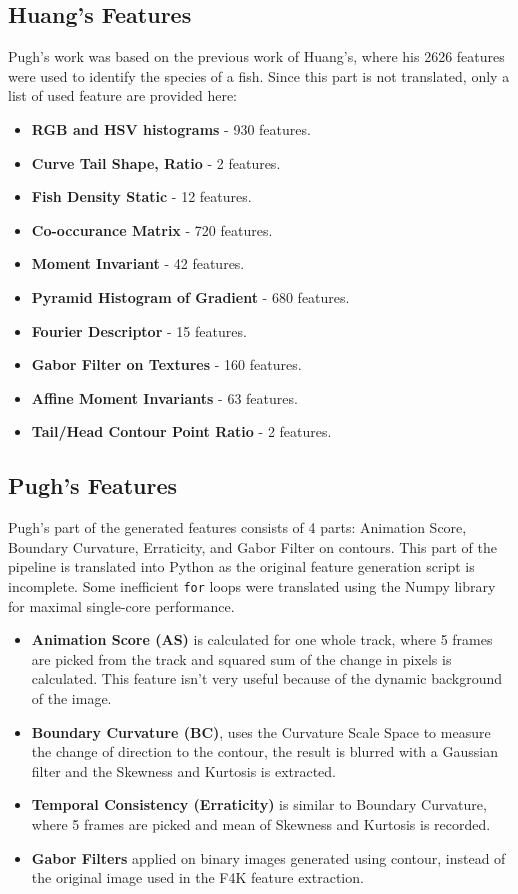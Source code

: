 \documentclass[bsc,logo,twoside,fullspacing,parskip]{infthesis}
\begin{document}
\subsection{Huang's Features}

Pugh's work was based on the previous work of Huang's\cite{Huang}, where his 2626 features were used to identify the species of a fish.
Since this part is not translated, only a list of used feature are provided here:
\begin{itemize}
\setlength{\parskip}{1pt}
\item \textbf{RGB and HSV histograms} - 930 features.
\item \textbf{Curve Tail Shape, Ratio} - 2 features.
\item \textbf{Fish Density Static} - 12 features.
\item \textbf{Co-occurance Matrix} - 720 features.
\item \textbf{Moment Invariant} - 42 features.
\item \textbf{Pyramid Histogram of Gradient} - 680 features.
\item \textbf{Fourier Descriptor} - 15 features.
\item \textbf{Gabor Filter on Textures} - 160 features.
\item \textbf{Affine Moment Invariants} - 63 features.
\item \textbf{Tail/Head Contour Point Ratio} - 2 features.
\end{itemize}

\subsection{Pugh's Features}

Pugh's part of the generated features consists of 4 parts: Animation Score, Boundary Curvature, Erraticity, and Gabor Filter on contours. 
This part of the pipeline is translated into Python as the original feature generation script is incomplete. Some inefficient {\tt for} loops were translated using the Numpy library for maximal single-core performance.

\begin{itemize}
\setlength{\parskip}{1pt}
\item
\textbf{Animation Score (AS)} is calculated for one whole track, where 5 frames are picked from the track and squared sum of the change in pixels is calculated. This feature isn't very useful because of the dynamic background of the image.
\item
\textbf{Boundary Curvature (BC)}, uses the Curvature Scale Space to measure the change of direction to the contour, the result is blurred with a Gaussian filter and the Skewness and Kurtosis is extracted. 
\item
\textbf{Temporal Consistency (Erraticity)} is similar to Boundary Curvature, where 5 frames are picked and mean of Skewness and Kurtosis is recorded.
\item
\textbf{Gabor Filters} applied on binary images generated using contour, instead of the original image used in the F4K feature extraction. 
\end{itemize}
\end{document}
